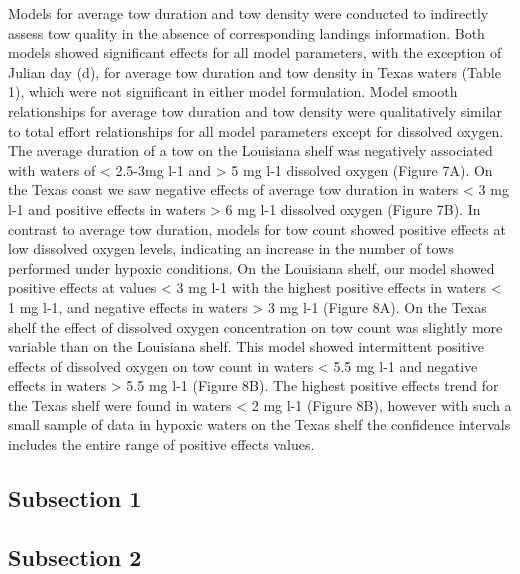 \documentclass[10pt]{article}
\begin{document}
Models for average tow duration and tow density were conducted to indirectly assess tow quality in the absence of corresponding landings information.  Both models showed significant effects for all model parameters, with the exception of Julian day (d), for average tow duration and tow density in Texas waters (Table 1), which were not significant in either model formulation.  Model smooth relationships for average tow duration and tow density were qualitatively similar to total effort relationships for all model parameters except for dissolved oxygen.  The average duration of a tow on the Louisiana shelf was negatively associated with waters of < 2.5-3mg l-1 and > 5 mg l-1 dissolved oxygen (Figure 7A).  On the Texas coast we saw negative effects of average tow duration in waters < 3 mg l-1 and positive effects in waters > 6 mg l-1 dissolved oxygen (Figure 7B).  In contrast to average tow duration, models for tow count showed positive effects at low dissolved oxygen levels, indicating an increase in the number of tows performed under hypoxic conditions.  On the Louisiana shelf, our model showed positive effects at values < 3 mg l-1 with the highest positive effects in waters < 1 mg l-1, and negative effects in waters > 3 mg l-1 (Figure 8A).  On the Texas shelf the effect of dissolved oxygen concentration on tow count was slightly more variable than on the Louisiana shelf.  This model showed intermittent positive effects of dissolved oxygen on tow count in waters < 5.5 mg l-1 and negative effects in waters > 5.5 mg l-1 (Figure 8B).  The highest positive effects trend for the Texas shelf were found in waters < 2 mg l-1 (Figure 8B), however with such a small sample of data in hypoxic waters on the Texas shelf the confidence intervals includes the entire range of positive effects values.  

\subsection*{Subsection 1}

\subsection*{Subsection 2}
\end{document}
